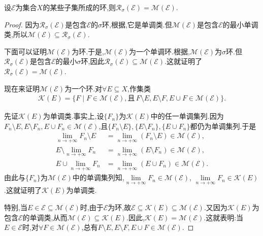 \documentclass[../../main.tex]{subfiles}%
\begin{document}
\begin{theorem}\label{theorem:集合论--定理1.3.9}
设$\mathscr{E}$为集合$X$的某些子集所成的环,则$\mathscr{R}_\sigma(\mathscr{E}) = \mathscr{M}(\mathscr{E})$.
\end{theorem}
\begin{proof}

因为$\mathscr{R}_\sigma(\mathscr{E})$是包含$\mathscr{E}$的$\sigma$环,根据,它是单调类.但$\mathscr{M}(\mathscr{E})$是包含$\mathscr{E}$的最小单调类,所以$\mathscr{M}(\mathscr{E}) \subseteq \mathscr{R}_\sigma(\mathscr{E})$.

下面可以证明$\mathscr{M}(\mathscr{E})$为环.于是,$\mathscr{M}(\mathscr{E})$为一个单调环.根据,$\mathscr{M}(\mathscr{E})$为$\sigma$环.但$\mathscr{R}_\sigma(\mathscr{E})$是包含$\mathscr{E}$的最小$\sigma$环,因此$\mathscr{R}_\sigma(\mathscr{E}) \subseteq \mathscr{M}(\mathscr{E})$.这就证明了$\mathscr{R}_\sigma(\mathscr{E}) = \mathscr{M}(\mathscr{E})$.

现在来证明$\mathscr{M}(\mathscr{E})$为一个环.对$\forall E \subseteq X$,作集类
\begin{align*}
\mathscr{K}(E) = \{F \mid F \in \mathscr{M}(\mathscr{E}), \text{且} \, F \setminus E, E \setminus F, E \cup F \in \mathscr{M}(\mathscr{E})\}.
\end{align*}

先证$\mathscr{K}(E)$为单调类.事实上,设$\{F_n\}$为$\mathscr{K}(E)$中的任一单调集列.因为$F_n \setminus E, E \setminus F_n, E \cup F_n \in \mathscr{M}(\mathscr{E})$,且$\{F_n \setminus E\},\{E \setminus F_n\},\{E \cup F_n\}$都仍为单调集列.于是
\begin{align*}
\lim\limits_{n \to +\infty} F_n \setminus E &= \lim\limits_{n \to +\infty} (F_n \setminus E) \in \mathscr{M}(\mathscr{E}), \\
E \setminus \lim\limits_{n \to +\infty} F_n &= \lim\limits_{n \to +\infty} (E \setminus F_n) \in \mathscr{M}(\mathscr{E}), \\
E \cup \lim\limits_{n \to +\infty} F_n &= \lim\limits_{n \to +\infty} (E \cup F_n) \in \mathscr{M}(\mathscr{E}).
\end{align*}
由此与$\{F_n\}$为$\mathscr{M}(\mathscr{E})$中的单调集列知,$\lim\limits_{n \to +\infty} F_n \in \mathscr{M}(\mathscr{E})$, $\lim\limits_{n \to +\infty} F_n \in \mathscr{K}(E)$.这就证明了$\mathscr{K}(E)$为单调类.

特别,当$E \in \mathscr{E} \subseteq \mathscr{M}(\mathscr{E})$时,由于$\mathscr{E}$为环,故$\mathscr{E} \subseteq \mathscr{K}(E) \subseteq \mathscr{M}(\mathscr{E})$.又因为$\mathscr{K}(E)$为包含$\mathscr{E}$的单调类,从而$\mathscr{M}(\mathscr{E}) \subseteq \mathscr{K}(E)$.因此,$\mathscr{K}(E) = \mathscr{M}(\mathscr{E})$.这就表明:当$E \in \mathscr{E}$时,对$\forall F \in \mathscr{M}(\mathscr{E})$,总有$F \setminus E, E \setminus F, E \cup F \in \mathscr{M}(\mathscr{E})$.


\end{proof}
\end{document}
